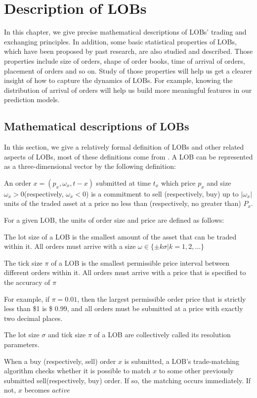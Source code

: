 \chapter{Description of LOBs  }
In this chapter,  we give precise mathematical descriptions of LOBs' trading and exchanging principles. 
In addition, some basic statistical properties of LOBs,  which have been proposed by past research,  are also studied and described. Those properties include size of orders,  shape of order books, time of arrival of orders,  placement of orders and so on. Study of those properties will help us get a clearer insight of how to capture the dynamics of LOBs. For example, knowing the distribution of arrival of orders will help us build more meaningful features in our prediction models. 
  
\section{Mathematical descriptions of LOBs}
In this section,  we give a relatively formal definition of LOBs and other related aspects of LOBs,  most of these definitions come from \cite{gould2013limit}. 
A LOB can be represented as a three-dimensional vector by the following definition: 
\begin{defn}\cite{gould2013limit}
An order $x=(p_x,  \omega_x, t-x)$ submitted at time $t_x$ which price $p_x$ and size $\omega_x>0$(respectively,  $\omega_x<0$) is a commitment to sell (respectively,  buy) up to $|\omega_x|$ units of the traded asset at a price no less than (respectively,  no greater than) $P_x$.
\end{defn}

For a given LOB,  the units of order size and price are defined as follows: 
\begin{defn}\cite{gould2013limit}
The lot size of a LOB is the smallest amount of the asset that can be traded within it. All orders must arrive with a size $\omega \in \{\pm k\sigma|k=1, 2, ...\}$
\end{defn}

\begin{defn}\cite{gould2013limit}
The tick size $\pi$ of a LOB is the smallest permissible price interval between different orders within it. All orders must arrive with a price that is specified to the accuracy of $\pi$
\end{defn}

For example,  if $\pi=0.01$,  then the largest permissible order price that is strictly less than \$1 is \$ 0.99,  and all orders must be submitted at a price with exactly two decimal places.
\begin{defn}\cite{gould2013limit}
The lot size $\sigma$ and tick size $\pi$ of a LOB are collectively called its resolution parameters.
\end{defn} 
\begin{defn}\cite{gould2013limit}
When a buy (respectively,  sell) order $x$ is submitted,  a LOB's trade-matching algorithm checks whether it is possible to match $x$ to some other previously submitted sell(respectively,  buy) order. If so,  the matching occurs immediately. If not,  $x$ becomes $active$
\end{defn}


